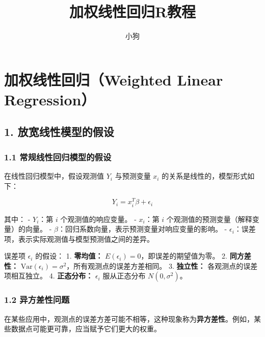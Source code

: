 \documentclass[
  10pt,
]{ctexart}
\title{加权线性回归R教程}
\author{小狗}
\date{}
\begin{document}
\maketitle

{
\setcounter{tocdepth}{2}
\tableofcontents
}
\hypertarget{ux52a0ux6743ux7ebfux6027ux56deux5f52weighted-linear-regression}{%
\section{加权线性回归（Weighted Linear
Regression）}\label{ux52a0ux6743ux7ebfux6027ux56deux5f52weighted-linear-regression}}

\hypertarget{ux653eux5bbdux7ebfux6027ux6a21ux578bux7684ux5047ux8bbe}{%
\subsection{1.
放宽线性模型的假设}\label{ux653eux5bbdux7ebfux6027ux6a21ux578bux7684ux5047ux8bbe}}

\hypertarget{ux5e38ux89c4ux7ebfux6027ux56deux5f52ux6a21ux578bux7684ux5047ux8bbe}{%
\subsubsection{1.1
常规线性回归模型的假设}\label{ux5e38ux89c4ux7ebfux6027ux56deux5f52ux6a21ux578bux7684ux5047ux8bbe}}

在线性回归模型中，假设观测值 \(Y_i\) 与预测变量 \(x_i\)
的关系是线性的，模型形式如下：

\[
Y_i = x_i^T \beta + \epsilon_i
\]

其中： - \(Y_i\)：第 \(i\) 个观测值的响应变量。 - \(x_i\)：第 \(i\)
个观测值的预测变量（解释变量）的向量。 -
\(\beta\)：回归系数向量，表示预测变量对响应变量的影响。 -
\(\epsilon_i\)：误差项，表示实际观测值与模型预测值之间的差异。

误差项 \(\epsilon_i\) 的假设： 1. \textbf{零均值：}
\(E(\epsilon_i) = 0\)，即误差的期望值为零。 2. \textbf{同方差性：}
\(\text{Var}(\epsilon_i) = \sigma^2\)，所有观测点的误差方差相同。 3.
\textbf{独立性：} 各观测点的误差项相互独立。 4. \textbf{正态分布：}
\(\epsilon_i\) 服从正态分布 \(N(0, \sigma^2)\)。

\hypertarget{ux5f02ux65b9ux5deeux6027ux95eeux9898}{%
\subsubsection{1.2
异方差性问题}\label{ux5f02ux65b9ux5deeux6027ux95eeux9898}}

在某些应用中，观测点的误差方差可能不相等，这种现象称为\textbf{异方差性}。例如，某些数据点可能更可靠，应当赋予它们更大的权重。
\end{document}
